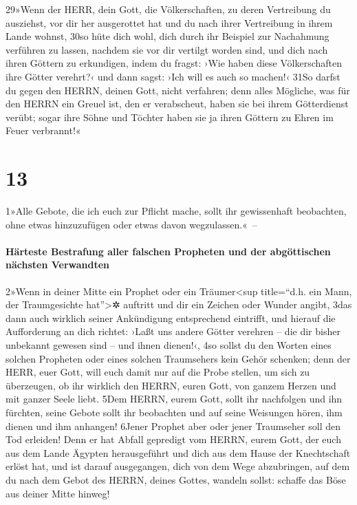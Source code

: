 29»Wenn der HERR, dein Gott, die Völkerschaften, zu deren Vertreibung du
ausziehst, vor dir her ausgerottet hat und du nach ihrer Vertreibung in
ihrem Lande wohnst, 30so hüte dich wohl, dich durch ihr Beispiel zur
Nachahmung verführen zu lassen, nachdem sie vor dir vertilgt worden
sind, und dich nach ihren Göttern zu erkundigen, indem du fragst: ›Wie
haben diese Völkerschaften ihre Götter verehrt?‹ und dann sagst: ›Ich
will es auch so machen!‹ 31So darfst du gegen den HERRN, deinen Gott,
nicht verfahren; denn alles Mögliche, was für den HERRN ein Greuel ist,
den er verabscheut, haben sie bei ihrem Götterdienst verübt; sogar ihre
Söhne und Töchter haben sie ja ihren Göttern zu Ehren im Feuer
verbrannt!«

\hypertarget{section-12}{%
\section{13}\label{section-12}}

1»Alle Gebote, die ich euch zur Pflicht mache, sollt ihr gewissenhaft
beobachten, ohne etwas hinzuzufügen oder etwas davon wegzulassen.«~--

\hypertarget{huxe4rteste-bestrafung-aller-falschen-propheten-und-der-abguxf6ttischen-nuxe4chsten-verwandten}{%
\paragraph{Härteste Bestrafung aller falschen Propheten und der
abgöttischen nächsten
Verwandten}\label{huxe4rteste-bestrafung-aller-falschen-propheten-und-der-abguxf6ttischen-nuxe4chsten-verwandten}}

2»Wenn in deiner Mitte ein Prophet oder ein Träumer\textless sup
title=``d.h. ein Mann, der Traumgesichte hat''\textgreater✲ auftritt und
dir ein Zeichen oder Wunder angibt, 3das dann auch wirklich seiner
Ankündigung entsprechend eintrifft, und hierauf die Aufforderung an dich
richtet: ›Laßt uns andere Götter verehren -- die dir bisher unbekannt
gewesen sind -- und ihnen dienen!‹, 4so sollst du den Worten eines
solchen Propheten oder eines solchen Traumsehers kein Gehör schenken;
denn der HERR, euer Gott, will euch damit nur auf die Probe stellen, um
sich zu überzeugen, ob ihr wirklich den HERRN, euren Gott, von ganzem
Herzen und mit ganzer Seele liebt. 5Dem HERRN, eurem Gott, sollt ihr
nachfolgen und ihn fürchten, seine Gebote sollt ihr beobachten und auf
seine Weisungen hören, ihm dienen und ihm anhangen! 6Jener Prophet aber
oder jener Traumseher soll den Tod erleiden! Denn er hat Abfall
gepredigt vom HERRN, eurem Gott, der euch aus dem Lande Ägypten
herausgeführt und dich aus dem Hause der Knechtschaft erlöst hat, und
ist darauf ausgegangen, dich von dem Wege abzubringen, auf dem du nach
dem Gebot des HERRN, deines Gottes, wandeln sollst: schaffe das Böse aus
deiner Mitte hinweg!

